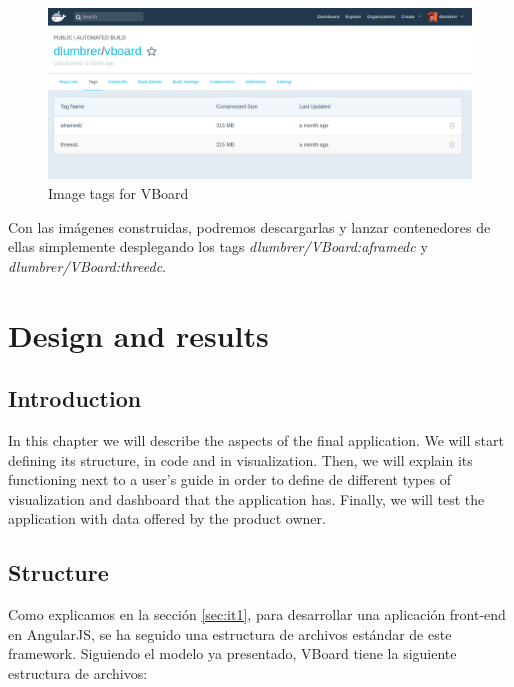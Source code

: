 \documentclass[a4paper, 12pt]{book}
\begin{document}
\begin{figure}[H]
  \centering
  \includegraphics[width=16cm, keepaspectratio]{img/development/dockerhub}
  \caption{Image tags for VBoard}
  \label{fig:examplestandalone}
\end{figure}

Con las imágenes construidas, podremos descargarlas y lanzar contenedores de ellas simplemente desplegando los tags \textit{dlumbrer/VBoard:aframedc} y \textit{dlumbrer/VBoard:threedc}.

 
\cleardoublepage
\chapter{Design and results}
\label{chap:dai}

\section{Introduction}
\label{sec:dint}

In this chapter we will describe the aspects of the final application. We will start defining its structure, in code and in visualization. Then, we will explain its functioning next to a user's guide in order to define de different types of visualization and dashboard that the application has. Finally, we will test the application with data offered by the product owner.

\section{Structure}

Como explicamos en la sección \ref{sec:it1}, para desarrollar una aplicación front-end en AngularJS, se ha seguido una estructura de archivos estándar de este framework. Siguiendo el modelo ya presentado, VBoard tiene la siguiente estructura de archivos:
\end{document}
